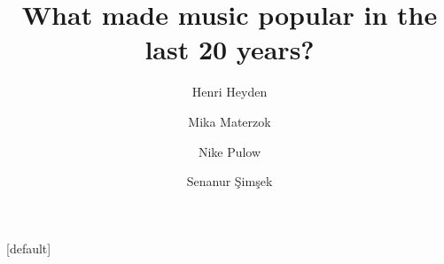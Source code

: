 

\usepackage[orientation=portrait,size=a0,scale=1.4]{beamerposter}
\usepackage{qrcode}
\usepackage{paracol}



\usepackage[pscoord]{eso-pic} %

[default] %
\renewcommand{\thempfootnote}{\arabic{mpfootnote}}

\newcommand{\placetextbox}[3]{%
  \AddToShipoutPictureFG*{%
    \put(\LenToUnit{#1\paperwidth},\LenToUnit{#2\paperheight}){%
      \vtop{{\null}\parbox{\linewidth}{#3}}%
    }%
  }%
}%

\renewcommand{\bibfont}{\tiny}

\author[H. Heyden \and M. Materzok \and N. Pulow \and S. Şimşek]{Henri Heyden \and Mika Materzok \and Nike Pulow \and Senanur Şimşek}
\title{What made music popular in the last 20 years?}




